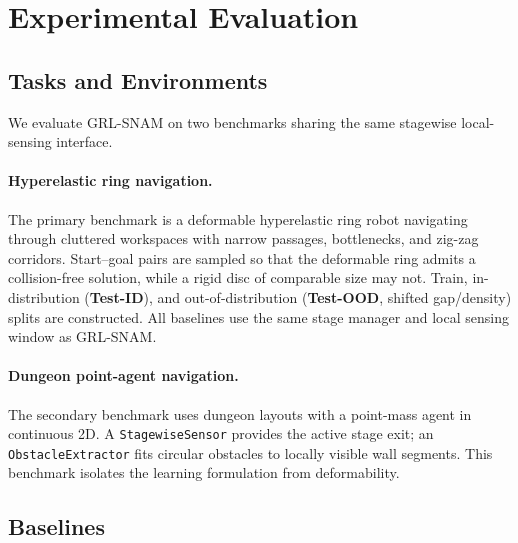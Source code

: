\section{Experimental Evaluation}
\label{sec:ch3:experiments}

\subsection{Tasks and Environments}
\label{subsec:ch3:tasks}

We evaluate GRL-SNAM on two benchmarks sharing the same
stagewise local-sensing interface.

\paragraph{Hyperelastic ring navigation.}
The primary benchmark is a deformable hyperelastic ring robot navigating
through cluttered workspaces with narrow passages, bottlenecks, and
zig-zag corridors.
Start–goal pairs are sampled so that the deformable ring admits a
collision-free solution, while a rigid disc of comparable size may not.
Train, in-distribution (\textbf{Test-ID}), and out-of-distribution
(\textbf{Test-OOD}, shifted gap/density) splits are constructed.
All baselines use the same stage manager and local sensing window as
GRL-SNAM.

\paragraph{Dungeon point-agent navigation.}
The secondary benchmark uses dungeon layouts
with a point-mass agent in continuous 2D.
A \texttt{StagewiseSensor} provides the active stage exit; an
\texttt{ObstacleExtractor} fits circular obstacles to locally visible
wall segments.
This benchmark isolates the learning formulation from deformability.

\subsection{Baselines}
\label{subsec:ch3:baselines}

